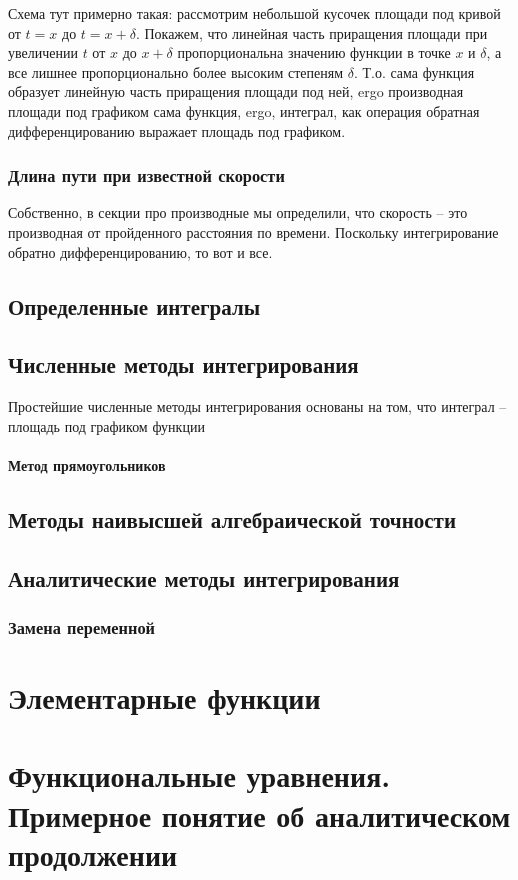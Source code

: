 \documentclass{article}
\begin{document}
Схема тут примерно такая: рассмотрим небольшой кусочек площади под
кривой от $t=x$ до $t=x+\delta$. Покажем, что линейная часть
приращения площади при увеличении $t$ от $x$ до $x+\delta$
пропорциональна значению функции в точке $x$ и $\delta$, а все лишнее
пропорционально более высоким степеням $\delta$. Т.о. сама функция
образует линейную часть приращения площади под ней, ergo производная
площади под графиком сама функция, ergo, интеграл, как операция
обратная дифференцированию выражает площадь под графиком.

\subsubsection{Длина пути при известной скорости}
Собственно, в секции про производные мы определили, что скорость -- это производная от пройденного расстояния по времени. Поскольку интегрирование обратно дифференцированию, то вот и все.
\subsection{Определенные интегралы}
\subsection{Численные методы интегрирования}
Простейшие численные методы интегрирования основаны на том, что интеграл -- площадь под графиком функции
\paragraph{Метод прямоугольников}
\subsection{Методы наивысшей алгебраической точности}
\subsection{Аналитические методы интегрирования}
\subsubsection{Замена переменной}
\section{Элементарные функции}
\section{Функциональные уравнения. Примерное понятие об аналитическом продолжении}
\end{document}
